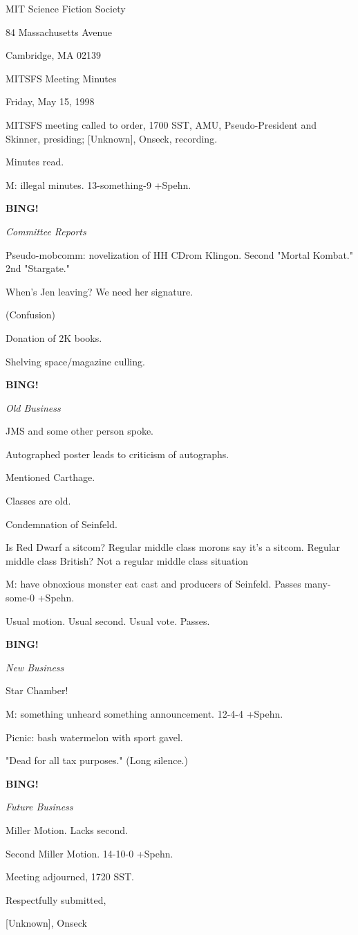 \documentclass[12pt]{article}
\newcommand{\bing}{{\bf BING!} }
\newcommand{\goto}[1]{\bing \vskip 12pt \centerline{{\em{#1}}}}
\begin{document}
\begin{center}

MIT Science Fiction Society 

84 Massachusetts Avenue

Cambridge, MA 02139

\vspace{12pt}

MITSFS Meeting Minutes 

Friday, May 15, 1998

\end{center}
 
\vspace{18pt}

\setlength{\parskip}{6pt}

\noindent
MITSFS meeting called to order, 1700 SST,
AMU, Pseudo-President and Skinner, presiding; [Unknown], Onseck, recording.

Minutes read.

M: illegal minutes. 13-something-9 +Spehn.

\goto{Committee Reports}

Pseudo-mobcomm: novelization of HH CDrom Klingon. Second "Mortal Kombat." 2nd "Stargate."

When's Jen leaving? We need her signature.

(Confusion)

Donation of 2K books.

Shelving space/magazine culling.

\goto{Old Business}

JMS and some other person spoke.

Autographed poster leads to criticism of autographs.

Mentioned Carthage.

Classes are old.

Condemnation of Seinfeld.

Is Red Dwarf a sitcom? Regular middle class morons say it's a sitcom. Regular middle class British? Not a regular middle class situation

M: have obnoxious monster eat cast and producers of Seinfeld. Passes many-some-0 +Spehn.

Usual motion. Usual second. Usual vote. Passes.

\goto{New Business}

Star Chamber!

M: something unheard something announcement. 12-4-4 +Spehn.

Picnic: bash watermelon with sport gavel.

"Dead for all tax purposes." (Long silence.)

\goto{Future Business}

Miller Motion. Lacks second.

Second Miller Motion. 14-10-0 +Spehn.

\vspace{12pt}

\noindent
Meeting adjourned, 1720 SST.

\vspace{18pt}

\centerline{Respectfully submitted,}
\centerline{[Unknown], Onseck}
\end{document}
